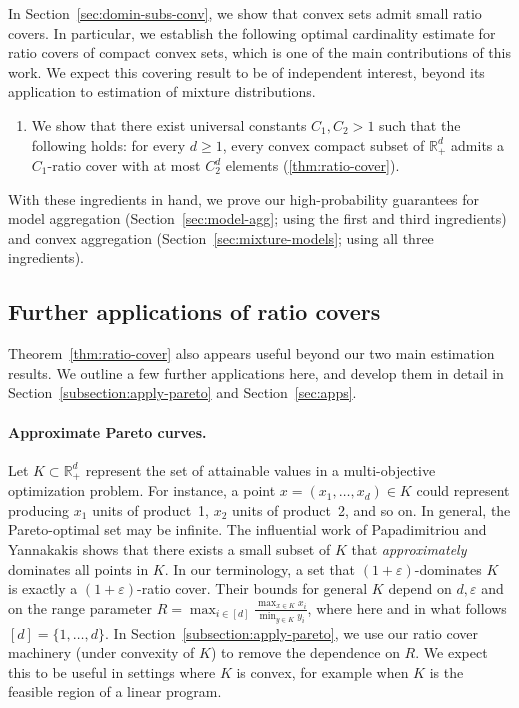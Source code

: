 \documentclass[11pt]{article}
\newcommand{\R}{\mathbb R}
\renewcommand{\geq}{\geqslant}
\newcommand{\eps}{\varepsilon}
\theoremstyle{definition}
\theoremstyle{remark}
\begin{document}
In Section~\ref{sec:domin-subs-conv}, we %
show
that convex sets admit small ratio covers.
In particular, we establish the following optimal cardinality estimate for ratio covers of compact convex sets, which is one of the main contributions of this work.
We expect this covering result to be of independent interest, beyond its application to estimation of mixture distributions.

\begin{framed}
  \begin{enumerate}
  \item[3.] We show that there exist universal constants $C_1, C_2>1$ such that the following holds: for every $d \geq 1$, every convex compact subset of $\R_+^d$ admits a $C_1$-ratio cover with at most $C_2^d$ elements (\cref{thm:ratio-cover}).
  \end{enumerate}
\end{framed}


With these ingredients in hand, we prove our high-probability guarantees for model aggregation (Section~\ref{sec:model-agg}; using the first and third ingredients) and convex aggregation (Section~\ref{sec:mixture-models}; using all three ingredients).

\subsection{Further applications of ratio covers}
Theorem~\ref{thm:ratio-cover} also appears useful beyond our two main estimation results. We outline a few further applications here, and develop them in detail in Section~\ref{subsection:apply-pareto} and Section~\ref{sec:apps}.

\paragraph{Approximate Pareto curves.}
Let $K \subset \R_+^d$ represent the set of attainable values in a multi-objective optimization problem. For instance, a point $x=(x_1,\dots,x_d)\in K$ could represent producing $x_1$ units of product~1, $x_2$ units of product~2, and so on. In general, the Pareto-optimal set may be infinite. The influential work of Papadimitriou and Yannakakis \cite{papadimitriou2000approximability} shows that there exists a small subset of $K$ that \textit{approximately} dominates all points in $K$. In our terminology, a set that $(1+\eps)$-dominates $K$ is exactly a $(1+\eps)$-ratio cover. Their bounds for general $K$ depend on $d,\eps$ and on the range parameter
$R = \max_{i \in [d]}\frac{\max_{x \in K} x_i}{\min_{y \in K} y_i}$, where here and in what follows $[d] = \{1, \ldots, d\}$.
In Section~\ref{subsection:apply-pareto}, we use our ratio cover machinery (under convexity of $K$) to remove the dependence on $R$. We expect this to be useful in settings where $K$ is convex, for example when $K$ is the feasible region of a linear program.
\end{document}
